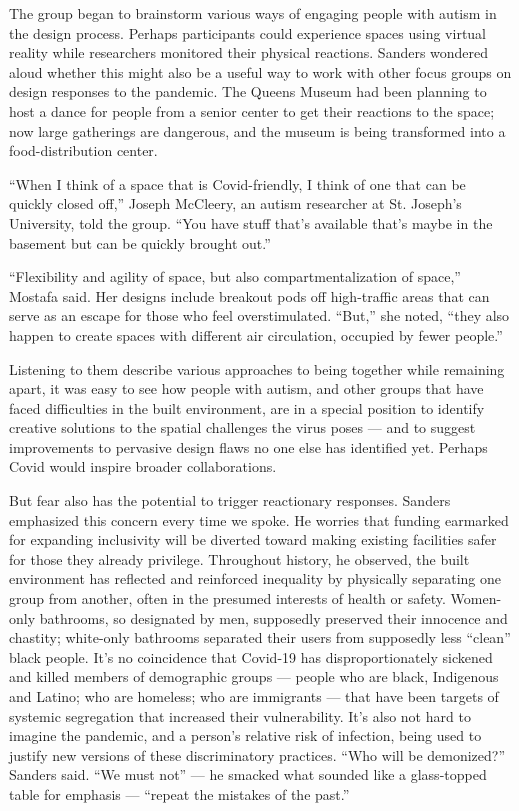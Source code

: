 The group began to brainstorm various ways of engaging people with
autism in the design process. Perhaps participants could experience
spaces using virtual reality while researchers monitored their physical
reactions. Sanders wondered aloud whether this might also be a useful
way to work with other focus groups on design responses to the pandemic.
The Queens Museum had been planning to host a dance for people from a
senior center to get their reactions to the space; now large gatherings
are dangerous, and the museum is being transformed into a
food-distribution center.

``When I think of a space that is Covid-friendly, I think of one that
can be quickly closed off,'' Joseph McCleery, an autism researcher at
St. Joseph's University, told the group. ``You have stuff that's
available that's maybe in the basement but can be quickly brought out.''

``Flexibility and agility of space, but also compartmentalization of
space,'' Mostafa said. Her designs include breakout pods off
high-traffic areas that can serve as an escape for those who feel
overstimulated. ``But,'' she noted, ``they also happen to create spaces
with different air circulation, occupied by fewer people.''

Listening to them describe various approaches to being together while
remaining apart, it was easy to see how people with autism, and other
groups that have faced difficulties in the built environment, are in a
special position to identify creative solutions to the spatial
challenges the virus poses --- and to suggest improvements to pervasive
design flaws no one else has identified yet. Perhaps Covid would inspire
broader collaborations.

But fear also has the potential to trigger reactionary responses.
Sanders emphasized this concern every time we spoke. He worries that
funding earmarked for expanding inclusivity will be diverted toward
making existing facilities safer for those they already privilege.
Throughout history, he observed, the built environment has reflected and
reinforced inequality by physically separating one group from another,
often in the presumed interests of health or safety. Women-only
bathrooms, so designated by men, supposedly preserved their innocence
and chastity; white-only bathrooms separated their users from supposedly
less ``clean'' black people. It's no coincidence that Covid-19 has
disproportionately sickened and killed members of demographic groups ---
people who are black, Indigenous and Latino; who are homeless; who are
immigrants --- that have been targets of systemic segregation that
increased their vulnerability. It's also not hard to imagine the
pandemic, and a person's relative risk of infection, being used to
justify new versions of these discriminatory practices. ``Who will be
demonized?'' Sanders said. ``We must not'' --- he smacked what sounded
like a glass-topped table for emphasis --- ``repeat the mistakes of the
past.''

